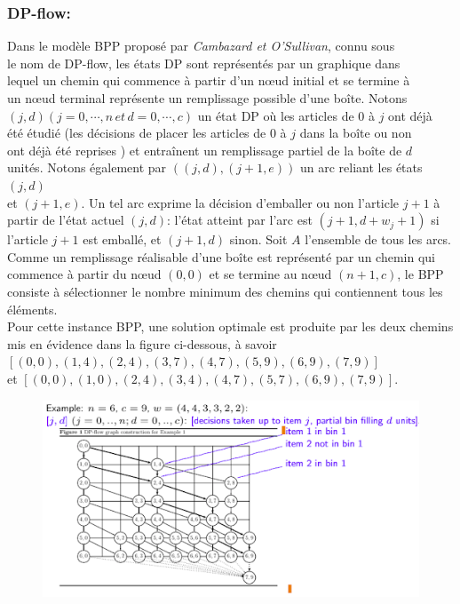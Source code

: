 \documentclass[class=report, crop=false]{standalone}
\begin{document}
        \subsubsection*{DP-flow:}
        Dans le modèle BPP proposé par \emph{Cambazard et O’Sullivan}, connu sous\\
        le nom de DP-flow, les états DP sont représentés par un graphique dans \\
        lequel un chemin qui commence à partir d'un nœud initial et se termine à \\ 
        un nœud terminal représente un remplissage possible d'une boîte. Notons \\
        \((j, d) (j = 0, \cdots, n \, et \, d = 0, \cdots, c)\) un état DP où les articles de \(0\) à \(j\) ont déjà \\
        été étudié (les décisions de placer les articles de \(0\) à \(j\) dans la boîte ou non\\
        ont déjà été reprises ) et entraînent un remplissage partiel de la boîte de \(d\) \\
        unités. Notons également par \(((j, d), (j + 1, e))\) un arc reliant les états \((j, d)\) \\
        et \((j + 1, e)\). Un tel arc exprime la décision d'emballer ou non l'article \(j + 1\) à partir de l'état actuel \((j, d)\): l'état atteint par l'arc est \((j + 1, d + w_j + 1)\) si l'article \(j + 1\) est emballé, et \((j + 1, d)\) sinon.
        Soit \(A\) l'ensemble de tous les arcs. Comme un remplissage réalisable d’une boîte est représenté par un chemin qui commence à partir du nœud \((0, 0)\) et se termine au nœud \((n + 1, c)\), le BPP consiste à sélectionner le nombre minimum des chemins qui contiennent tous les éléments. \\
        Pour cette instance BPP, une solution optimale est produite par les deux chemins mis en évidence dans la figure ci-dessous, à savoir \\\([(0,0), (1,4), (2,4), (3,7), (4,7), (5,9), (6,9), (7,9)]\) \\
        et \([(0,0), (1,0), (2,4), (3,4), (4,7), (5,7), (6,9), (7,9)]\).
        \begin{figure}[h!]
            \includegraphics[width=13.5cm]{../figures/DP-flow.png}
        \end{figure}
\end{document}

